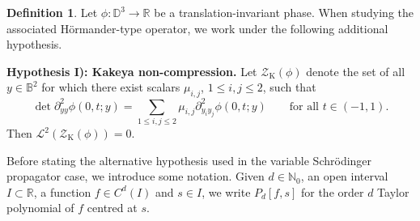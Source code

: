 \documentclass[reqno]{amsart}
\numberwithin{equation}{section}
\newcommand{\B}{\mathbb{B}}
\newcommand{\D}{\mathbb{D}}
\newcommand{\N}{\mathbb{N}}
\newcommand{\R}{\mathbb{R}}
\newcommand{\cL}{\mathcal{L}}
\newcommand{\cZ}{\mathcal{Z}}
\theoremstyle{plain}
\theoremstyle{definition}
\newtheorem{definition}[theorem]{Definition}
\begin{document}
\begin{definition}\label{dfn: n=3 lin comb K} Let $\phi \colon \D^3 \to \R$ be a translation-invariant phase. When studying the associated H\"ormander-type operator, we work under the following additional hypothesis.\medskip



\noindent \textbf{Hypothesis I): Kakeya non-compression.} Let $\cZ_{\mathrm{K}}(\phi)$ denote the set of all $y \in \B^2$ for which there exist scalars $\mu_{i,j}$, $1 \leq i, j \leq 2$, such that
   \begin{equation*}
    \det \partial_{yy}^2\phi(0,t;y) = \sum_{1 \leq i, j \leq 2} \mu_{i,j} \partial_{y_iy_j}^2 \phi(0,t;y) \qquad \textrm{for all $t \in (-1,1)$.}
\end{equation*} 
Then $\cL^2(\cZ_{\mathrm{K}}(\phi)) = 0$. 
\end{definition}

Before stating the alternative hypothesis used in the variable Schr\"odinger propagator case, we introduce some notation. Given $d \in \N_0$, an open interval $I \subset \R$, a function $f \in C^d(I)$ and $s \in I$, we write $P_d[f,s]$ for the order $d$ Taylor polynomial of $f$ centred at $s$. 
\end{document}
